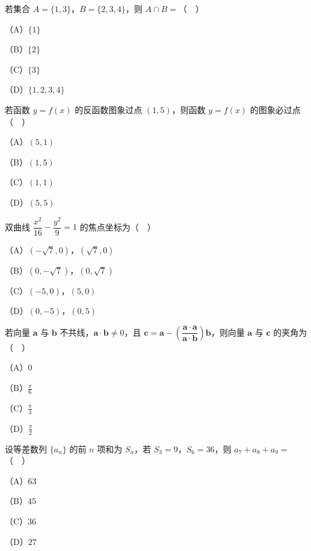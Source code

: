 


\begin{question}
若集合 $A=\{1,3\}$，$B=\{2,3,4\}$，则 $A\cap B=$（　）

（A）$\{1\}$

（B）$\{2\}$

（C）$\{3\}$

（D）$\{1,2,3,4\}$

\end{question}
\begin{question}
若函数 $y=f(x)$ 的反函数图象过点 $(1,5)$，则函数 $y=f(x)$ 的图象必过点（　）

（A）$(5,1)$

（B）$(1,5)$

（C）$(1,1)$

（D）$(5,5)$

\end{question}
\begin{question}
双曲线 $\dfrac{x^2}{16}-\dfrac{y^2}{9}=1$ 的焦点坐标为（　）

（A）$(-\sqrt7,0)$，$(\sqrt7,0)$

（B）$(0,-\sqrt7)$，$(0,\sqrt7)$

（C）$(-5,0)$，$(5,0)$

（D）$(0,-5)$，$(0,5)$

\end{question}
\begin{question}
若向量 $\boldsymbol a$ 与 $\boldsymbol b$ 不共线，$\boldsymbol a\cdot\boldsymbol b\neq0$，且 $\boldsymbol c=\boldsymbol a-\left(\dfrac{\boldsymbol a\cdot\boldsymbol a}{\boldsymbol a\cdot\boldsymbol b}\right)\boldsymbol b$，则向量 $\boldsymbol a$ 与 $\boldsymbol c$ 的夹角为（　）

（A）$0$

（B）$\frac{\pi}{6}$

（C）$\frac{\pi}{3}$

（D）$\frac{\pi}{2}$

\end{question}
\begin{question}
设等差数列 $\{a_n\}$ 的前 $n$ 项和为 $S_n$，若 $S_3=9$，$S_6=36$，则 $a_7+a_8+a_9=$（　）

（A）$63$

（B）$45$

（C）$36$

（D）$27$

\end{question}
